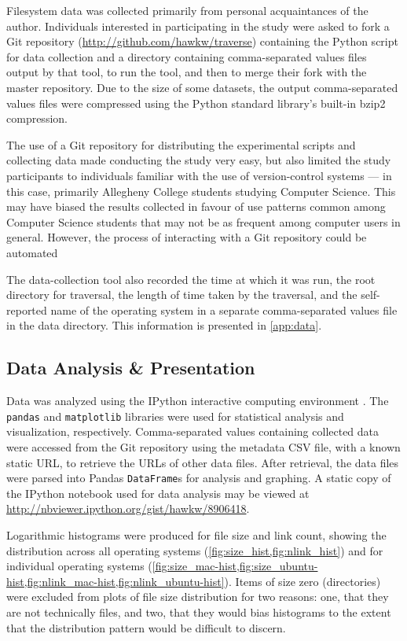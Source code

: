 \documentclass[12pt,letterpaper]{article}
\begin{document}
			Filesystem data was collected primarily from personal acquaintances of the author. Individuals interested in participating in the study were asked to fork a Git repository (\url{http://github.com/hawkw/traverse}) containing the Python script for data collection and a directory containing comma-separated values files output by that tool, to run the tool, and then to merge their fork with the master repository. Due to the size of some datasets, the output comma-separated values files were compressed using the Python standard library's built-in bzip2 compression.

			The use of a Git repository for distributing the experimental scripts and collecting data made conducting the study very easy, but also limited the study participants to individuals familiar with the use of version-control systems --- in this case, primarily Allegheny College students studying Computer Science. This may have biased the results collected in favour of use patterns common among Computer Science students that may not be as frequent among computer users in general. However, the process of interacting with a Git repository could be automated 

			The data-collection tool also recorded the time at which it was run, the root directory for traversal, the length of time taken by the traversal,  and the self-reported name of the operating system in a separate comma-separated values file in the data directory. This information is presented in \cref{app:data}.

		\subsection{Data Analysis \& Presentation}

			Data was analyzed using the IPython interactive computing environment \cite{ipython}. The \texttt{pandas} and \texttt{matplotlib} libraries \cite{pandas,matplotlib} were used for statistical analysis and visualization, respectively. Comma-separated values containing collected data were accessed from the Git repository using the metadata CSV file, with a known static URL, to retrieve the URLs of other data files. After retrieval, the data files were parsed into Pandas \texttt{DataFrame}s for analysis and graphing. A static copy of the IPython notebook used for data analysis may be viewed at \allowbreak\url{http://nbviewer.ipython.org/gist/hawkw/8906418}.

			Logarithmic histograms were produced for file size and link count, showing the distribution across all operating systems (\cref{fig:size_hist,fig:nlink_hist}) and for individual operating systems (\cref{fig:size_mac-hist,fig:size_ubuntu-hist,fig:nlink_mac-hist,fig:nlink_ubuntu-hist}). Items of size zero (directories) were excluded from plots of file size distribution for two reasons: one, that they are not technically files, and two, that they would bias histograms to the extent that the distribution pattern would be difficult to discern.
\end{document}
